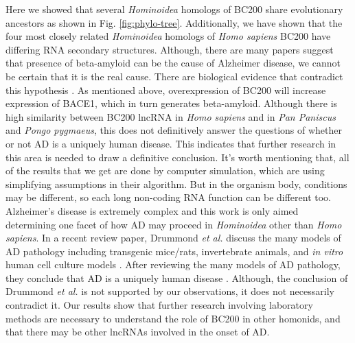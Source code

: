 \documentclass[conference, 11pt]{IEEEtran}
\begin{document}
{Here we showed that several \emph{Hominoidea} homologs of BC200 share evolutionary ancestors as shown in Fig. \ref{fig:phylo-tree}. 
Additionally, we have shown that the four most closely related \emph{Hominoidea} homologs of \emph{Homo sapiens} BC200 have differing RNA secondary structures.
Although, there are many papers suggest that presence of beta-amyloid can be the cause of Alzheimer disease, we cannot be certain that it is the real cause. 
There are biological evidence that contradict this hypothesis \cite{selkoe2016amyloid}. 
As mentioned above, overexpression of BC200 will increase expression of BACE1, which in turn generates beta-amyloid. 
Although there is high similarity between BC200 lncRNA in \emph{Homo sapiens} and in \emph{Pan Paniscus} and \emph{Pongo pygmaeus}, this does not definitively answer the questions of whether or not AD is a uniquely human disease.
This indicates that further research in this area is needed to draw a definitive conclusion. 
It's worth mentioning that, all of the results that we get are done by computer simulation, which are using simplifying assumptions in their algorithm. 
But in the organism body, conditions may be different, so each long non-coding RNA function can be different too. 
Alzheimer’s disease is extremely complex and this work is only aimed determining one facet of how AD may proceed in \emph{Hominoidea} other than \emph{Homo sapiens}. 
In a recent review paper, Drummond \emph{et al.} discuss the many models of AD pathology including transgenic mice/rats, invertebrate animals, and \emph{in vitro} human cell culture models \cite{drummond2017alzheimer}. 
After reviewing the many models of AD pathology, they conclude that AD is a uniquely human disease \cite{drummond2017alzheimer}. 
Although, the conclusion of Drummond \emph{et al.} is not supported by our observations, it does not necessarily contradict it. 
Our results show that further research involving laboratory methods are necessary to understand the role of BC200 in other homonids, and that there may be other lncRNAs involved in the onset of AD.

}
\end{document}
